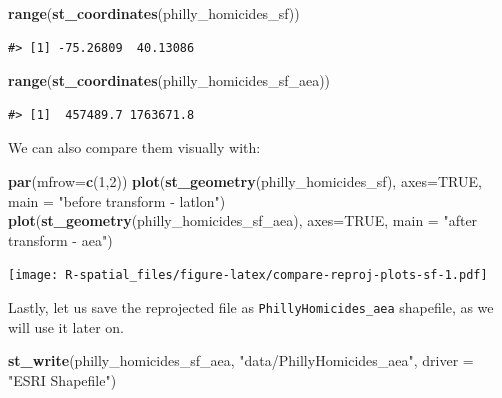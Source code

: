\documentclass[
]{book}
\newenvironment{Shaded}{\begin{snugshade}}{\end{snugshade}}
\newcommand{\AttributeTok}[1]{\textcolor[rgb]{0.13,0.29,0.53}{#1}}
\newcommand{\ConstantTok}[1]{\textcolor[rgb]{0.56,0.35,0.01}{#1}}
\newcommand{\DecValTok}[1]{\textcolor[rgb]{0.00,0.00,0.81}{#1}}
\newcommand{\FunctionTok}[1]{\textcolor[rgb]{0.13,0.29,0.53}{\textbf{#1}}}
\newcommand{\NormalTok}[1]{#1}
\newcommand{\StringTok}[1]{\textcolor[rgb]{0.31,0.60,0.02}{#1}}
\begin{document}
\begin{Shaded}
\begin{Highlighting}[]
\FunctionTok{range}\NormalTok{(}\FunctionTok{st\_coordinates}\NormalTok{(philly\_homicides\_sf))}
\end{Highlighting}
\end{Shaded}

\begin{verbatim}
#> [1] -75.26809  40.13086
\end{verbatim}

\begin{Shaded}
\begin{Highlighting}[]
\FunctionTok{range}\NormalTok{(}\FunctionTok{st\_coordinates}\NormalTok{(philly\_homicides\_sf\_aea))}
\end{Highlighting}
\end{Shaded}

\begin{verbatim}
#> [1]  457489.7 1763671.8
\end{verbatim}

We can also compare them visually with:

\begin{Shaded}
\begin{Highlighting}[]
\FunctionTok{par}\NormalTok{(}\AttributeTok{mfrow=}\FunctionTok{c}\NormalTok{(}\DecValTok{1}\NormalTok{,}\DecValTok{2}\NormalTok{)) }
\FunctionTok{plot}\NormalTok{(}\FunctionTok{st\_geometry}\NormalTok{(philly\_homicides\_sf), }\AttributeTok{axes=}\ConstantTok{TRUE}\NormalTok{, }\AttributeTok{main =} \StringTok{"before transform {-} latlon"}\NormalTok{)}
\FunctionTok{plot}\NormalTok{(}\FunctionTok{st\_geometry}\NormalTok{(philly\_homicides\_sf\_aea), }\AttributeTok{axes=}\ConstantTok{TRUE}\NormalTok{, }\AttributeTok{main =} \StringTok{"after transform {-} aea"}\NormalTok{)}
\end{Highlighting}
\end{Shaded}

\texttt{[image: R-spatial\_files/figure-latex/compare-reproj-plots-sf-1.pdf]}

Lastly, let us save the reprojected file as \texttt{PhillyHomicides\_aea} shapefile, as we will use it later on.

\begin{Shaded}
\begin{Highlighting}[]
\FunctionTok{st\_write}\NormalTok{(philly\_homicides\_sf\_aea, }\StringTok{"data/PhillyHomicides\_aea"}\NormalTok{, }\AttributeTok{driver =} \StringTok{"ESRI Shapefile"}\NormalTok{)}
\end{Highlighting}
\end{Shaded}
\end{document}
